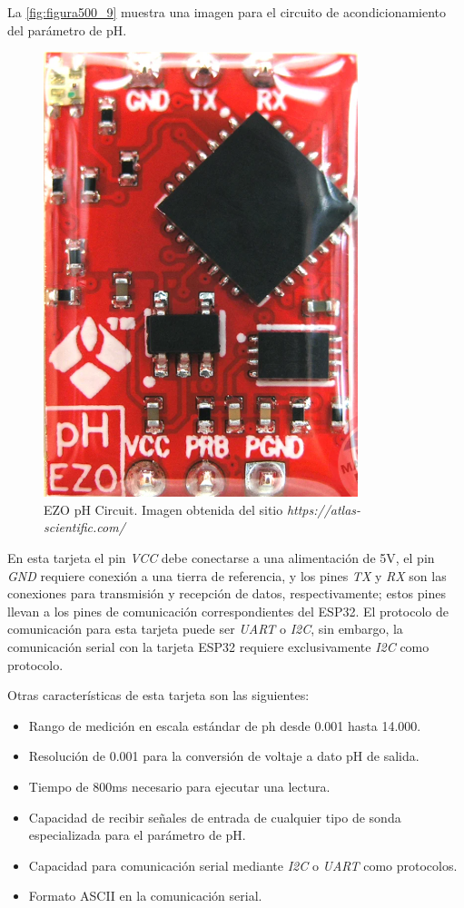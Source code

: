 La \autoref{fig:figura500_9} muestra una imagen para el circuito de acondicionamiento del parámetro de pH.

\clearpage

\begin{figure}[h]
	\centering
	\includegraphics[scale=0.7]{imgss209.png}
	\caption{EZO pH Circuit. Imagen obtenida del sitio \textit{https://atlas-scientific.com/}}
	\label{fig:figura500_9}
\end{figure}

En esta tarjeta el pin \textit{VCC} debe conectarse a una alimentación de 5V, el pin \textit{GND} requiere conexión a una tierra de referencia, y los pines \textit{TX} y \textit{RX} son las conexiones para transmisión y 
recepción de datos, respectivamente; estos pines llevan a los pines de comunicación correspondientes del ESP32. El protocolo de comunicación para esta tarjeta puede ser \textit{UART} o \textit{I2C}, sin embargo, la comunicación 
serial con la tarjeta ESP32 requiere exclusivamente \textit{I2C} como protocolo.

Otras características de esta tarjeta son las siguientes:

\begin{itemize}
    \item Rango de medición en escala estándar de ph desde 0.001 hasta 14.000.
    \item Resolución de 0.001 para la conversión de voltaje a dato pH de salida.
    \item Tiempo de 800ms necesario para ejecutar una lectura.
    \item Capacidad de recibir señales de entrada de cualquier tipo de sonda especializada para el parámetro de pH.
    \item Capacidad para comunicación serial mediante \textit{I2C} o \textit{UART} como protocolos.
    \item Formato ASCII en la comunicación serial.
\end{itemize}

